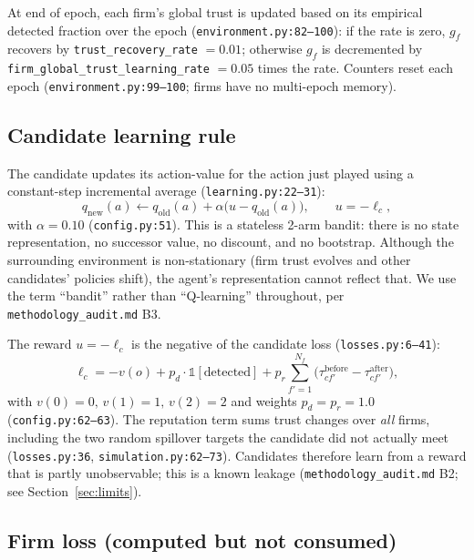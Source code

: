 \documentclass[11pt]{article}
\begin{document}
At end of epoch, each firm's global trust is updated based on its empirical
detected fraction over the epoch
(\texttt{environment.py:82--100}): if the rate is zero, \(g_{f}\) recovers by
\texttt{trust\_recovery\_rate} \(=0.01\); otherwise \(g_{f}\) is decremented by
\texttt{firm\_global\_trust\_learning\_rate} \(=0.05\) times the rate.
Counters reset each epoch (\texttt{environment.py:99--100}; firms have no
multi-epoch memory).

\subsection{Candidate learning rule}

The candidate updates its action-value for the action just played using a
constant-step incremental average (\texttt{learning.py:22--31}):
\begin{equation}
  q_{\text{new}}(a) \leftarrow q_{\text{old}}(a)
       + \alpha \bigl(u - q_{\text{old}}(a)\bigr),\qquad u = -\ell_{c},
\end{equation}
with \(\alpha = 0.10\) (\texttt{config.py:51}).
This is a stateless 2-arm bandit: there is no state representation, no
successor value, no discount, and no bootstrap. Although the surrounding
environment is non-stationary (firm trust evolves and other candidates' policies
shift), the agent's representation cannot reflect that. We use the term
``bandit'' rather than ``Q-learning'' throughout, per
\texttt{methodology\_audit.md} B3.

The reward \(u = -\ell_{c}\) is the negative of the candidate loss
(\texttt{losses.py:6--41}):
\begin{equation}
  \ell_{c} = -v(o) + p_{d}\cdot \mathbb{1}[\text{detected}]
       + p_{r} \sum_{f'=1}^{N_{f}}\bigl(\tau_{cf'}^{\text{before}}-\tau_{cf'}^{\text{after}}\bigr),
\end{equation}
with \(v(0){=}0,\,v(1){=}1,\,v(2){=}2\) and weights
\(p_{d}=p_{r}=1.0\) (\texttt{config.py:62--63}).
The reputation term sums trust changes over \emph{all} firms, including the
two random spillover targets the candidate did not actually meet
(\texttt{losses.py:36}, \texttt{simulation.py:62--73}). Candidates therefore
learn from a reward that is partly unobservable; this is a known leakage
(\texttt{methodology\_audit.md} B2; see Section~\ref{sec:limits}).

\subsection{Firm loss (computed but not consumed)}
\end{document}
